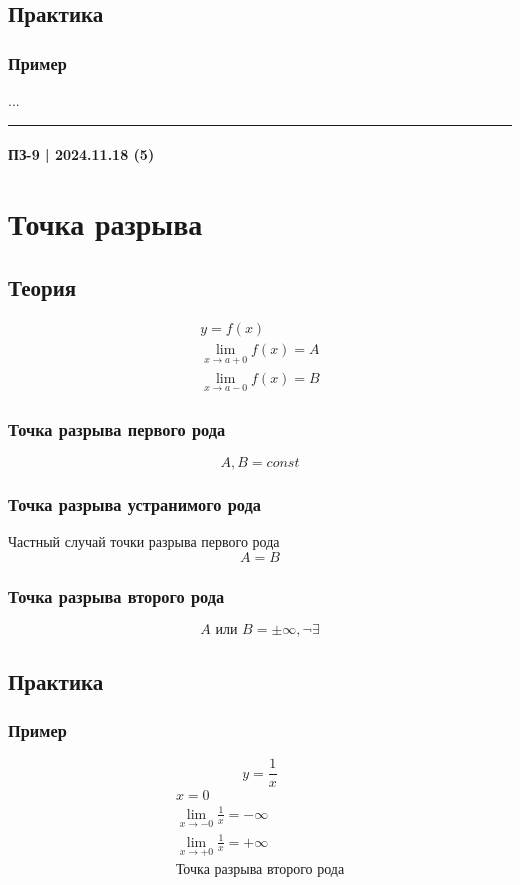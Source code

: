\documentclass{article}
\begin{document}
\subsection{Практика}

\subsubsection{Пример}
...



\par\noindent\rule{\textwidth}{1pt}
\paragraph{ПЗ-9 | 2024.11.18 (5)}
\section{Точка разрыва}

\subsection{Теория}

\begin{gather*}
    y = f(x) \\
    \lim_{x \to a + 0} f(x) = A \\
    \lim_{x \to a -  0} f(x) = B
\end{gather*}


\subsubsection{Точка разрыва первого рода}
\[
    A, B = const
\]
\subsubsection{Точка разрыва устранимого рода}
Частный случай точки разрыва первого рода
\[
    A = B
\]

\subsubsection{Точка разрыва второго рода}
\[
    A \text{ или } B = \pm \infty, \neg \exists
\]


\subsection{Практика}

\subsubsection{Пример}
\[
    y = \frac{1}{x}
\]
\begin{gather*}
    x = 0 \\
    \lim_{x \to -0} \frac{1}{x} = -\infty \\
    \lim_{x \to +0} \frac{1}{x} = +\infty \\
    \text{Точка разрыва второго рода} 
\end{gather*}
\end{document}
